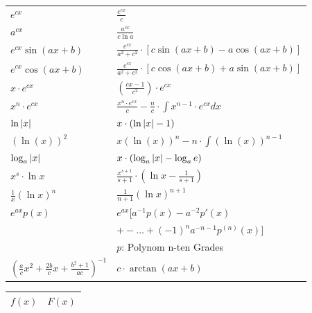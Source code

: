 \documentclass[a4paper]{article}
\begin{document}
\begin{appendix}
\begin{fmerke}
\begin{multicols}{2}
\begin{tabular}{l|l}
					$e^{cx}$            &  $\frac{e^{cx}}{c}$ \\
					$a^{cx}$            &  $\frac{a^{cx}}{c\ln{a}}$ \\
					$e^{cx}\sin{\left(ax+b\right)}$            &  $\frac{e^{cx}}{a^2+c^2}\cdot\left[ c\sin{\left(ax+b\right)}-a\cos{\left(ax+b\right)}\right]$ \\
					$e^{cx}\cos{\left(ax+b\right)}$            &  $\frac{e^{cx}}{a^2+c^2}\cdot\left[ c\cos{\left(ax+b\right)}+a\sin{\left(ax+b\right)}\right]$ \\

					$x\cdot e^{cx}$             &  $\left(\frac{cx-1}{c^2}\right)\cdot e^{cx}$ \\
					$x^n \cdot e^{cx}$             &  $\frac{x^n \cdot e^{cx}}{c} - \frac{n}{c} \cdot \int x^{n-1} \cdot e^{cx} dx$ \\

					$\ln\left|x\right|$            &  $x\cdot (\ln\left|x\right|-1)$ \\
					$(\ln(x))^2$            &  $x(\ln(x))^n -n \cdot \int (\ln(x))^{n-1}$ \\
					$\log_a{\left|x\right|}$            &  $x\cdot (\log_a{\left|x\right|}-\log_a{e})$ \\
					$x^s\cdot \ln{x}$            &  $\frac{x^{s+1}}{s+1}\cdot\left(\ln{x}-\frac{1}{s+1}\right)$ \\
					$\frac{1}{x}(\ln{x})^n$            &  $\frac{1}{n+1}(\ln{x})^{n+1}$ \\
					$e^{ax} p(x)$           &   $e^{ax} [ a^{-1}p(x) - a^{-2}p'(x) $ \\
								& $+- ... + (-1)^n a^{-n -1} p^{(n)}(x) ]$\\
								&   \small $p$: Polynom n-ten Grades\\
					$(\frac{a}{c}x^2 + \frac{2b}{c}x + \frac{b^2+1}{ac})^{-1}$   &  $c \cdot \arctan(ax + b)$

				\end{tabular}

				\begin{tabular}{l|l}
					$f(x)$ & $F(x)$ \\ \hline


\end{tabular}
\end{multicols}
\end{fmerke}
\end{appendix}
\end{document}
